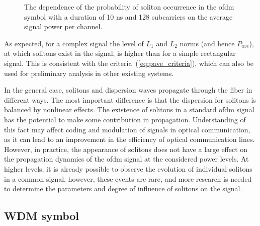 \begin{figure}[htpb]
    \caption{The dependence of the probability of soliton occurrence in the \acrshort{ofdm} symbol with a duration of 10 ns and 128 subcarriers on the average signal power per channel.}
    \label{fig:ofdm_result_sub_128}
\end{figure}

As expected, for a complex signal the level of $L_1$ and $L_2$ norms (and hence $P_ {ave}$), at which solitons exist in the signal, is higher than for a simple rectangular signal. This is consistent with the criteria~(\ref{eq:pave_criteria}), which can also be used for preliminary analysis in other existing systems. 

In the general case, solitons and dispersion waves propagate through the fiber in different ways. The most important difference is that the dispersion for solitons is balanced by nonlinear effects. The existence of solitons in a standard \acrshort{ofdm} signal has the potential to make some contribution in propagation. Understanding of this fact may affect coding and modulation of signals in optical communication, as it can lead to an improvement in the efficiency of optical communication lines. However, in practice, the appearance of solitons does not have a large effect on the propagation dynamics of the \acrshort{ofdm} signal at the considered power levels. At higher levels, it is already possible to observe the evolution of individual solitons in a common signal, however, these events are rare, and more research is needed to determine the parameters and degree of influence of solitons on the signal.

\clearpage

\subsection{WDM symbol} 

